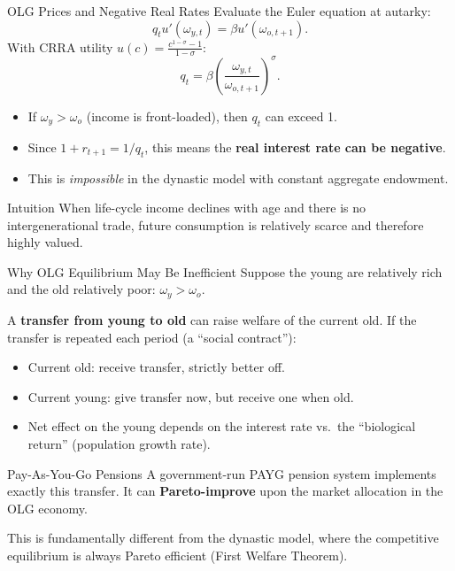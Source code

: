 \documentclass[aspectratio=169,10pt]{beamer}
\begin{document}
\begin{frame}{OLG Prices and Negative Real Rates}
Evaluate the Euler equation at autarky:
\[
q_t u'(\omega_{y,t})=\beta u'(\omega_{o,t+1}).
\]
With CRRA utility $u(c)=\frac{c^{1-\sigma}-1}{1-\sigma}$:
\[
\boxed{q_t=\beta\left(\frac{\omega_{y,t}}{\omega_{o,t+1}}\right)^{\sigma}.}
\tag{5.24}
\]

\begin{itemize}
  \item If $\omega_y>\omega_o$ (income is front-loaded), then $q_t$ can exceed 1.
  \item Since $1+r_{t+1}=1/q_t$, this means the \textbf{real interest rate can be negative}.
  \item This is \emph{impossible} in the dynastic model with constant aggregate endowment.
\end{itemize}

\begin{block}{Intuition}
When life-cycle income declines with age and there is no intergenerational trade, future consumption is relatively scarce and therefore highly valued.
\end{block}
\end{frame}

\begin{frame}{Why OLG Equilibrium May Be Inefficient}
Suppose the young are relatively rich and the old relatively poor: $\omega_y>\omega_o$.

\medskip
A \textbf{transfer from young to old} can raise welfare of the current old. If the transfer is repeated each period (a ``social contract''):
\begin{itemize}
  \item Current old: receive transfer, strictly better off.
  \item Current young: give transfer now, but receive one when old.
  \item Net effect on the young depends on the interest rate vs.\ the ``biological return'' (population growth rate).
\end{itemize}

\begin{block}{Pay-As-You-Go Pensions}
A government-run PAYG pension system implements exactly this transfer. It can \textbf{Pareto-improve} upon the market allocation in the OLG economy.
\end{block}

\medskip
This is fundamentally different from the dynastic model, where the competitive equilibrium is always Pareto efficient (First Welfare Theorem).
\end{frame}
\end{document}
